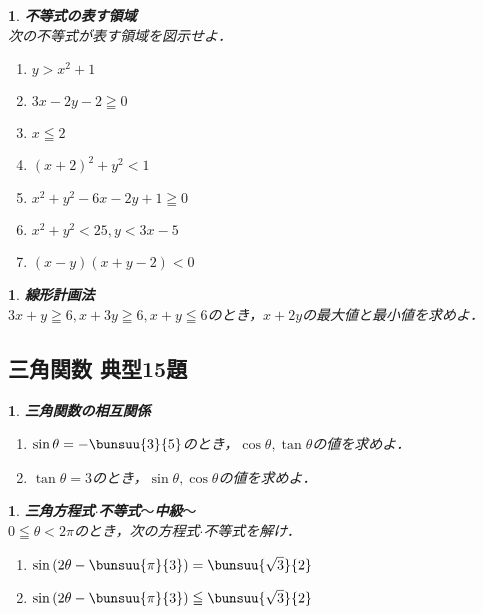 \documentclass[10pt,
fleqn,
dvipdfmx,
uplatex
]{jsarticle}
\newtheorem{question}[Question]{}
\begin{document}
\begin{question}{\bf\boldmath 不等式の表す領域}\\
次の不等式が表す領域を図示せよ．
\begin{enumerate}
\item $y>x^2+1$
\item $3x-2y-2\geqq 0$
\item $x\leqq 2$
\item $\left(x+2\right)^2+y^2<1$
\item $x^2+y^2-6x-2y+1\geqq 0$
\item $x^2+y^2<{25}, y<3x-5$
\item $\left(x-y\right)\left(x+y-2\right)<0$
\end{enumerate}

\end{question}



\begin{question}{\bf\boldmath 線形計画法}\\
$3x+y\geqq 6, x+3y\geqq 6, x+y\leqq 6$のとき，$x+2y$の最大値と最小値を求めよ．
\end{question}

\subsection{三角関数 典型15題}



\begin{question}{\bf\boldmath 三角関数の相互関係}\\

\begin{enumerate}
\item $\sin \theta =-\bunsuu{3}{5}$のとき，$\cos \theta , \tan \theta$の値を求めよ．
\item $\tan \theta =3$のとき，$\sin \theta , \cos \theta$の値を求めよ．
\end{enumerate}

\end{question}



\begin{question}{\bf\boldmath 三角方程式$\cdot$不等式$〜$中級$〜$}\\
$0\leqq \theta <2\pi$のとき，次の方程式$\cdot$不等式を解け．
\begin{enumerate}
\item $\sin \left(2\theta -\bunsuu{\pi }{3}\right)=\bunsuu{{\sqrt 3}}{2}$
\item $\sin \left(2\theta -\bunsuu{\pi }{3}\right)\leqq \bunsuu{{\sqrt 3}}{2}$
\end{enumerate}

\end{question}
\end{document}
